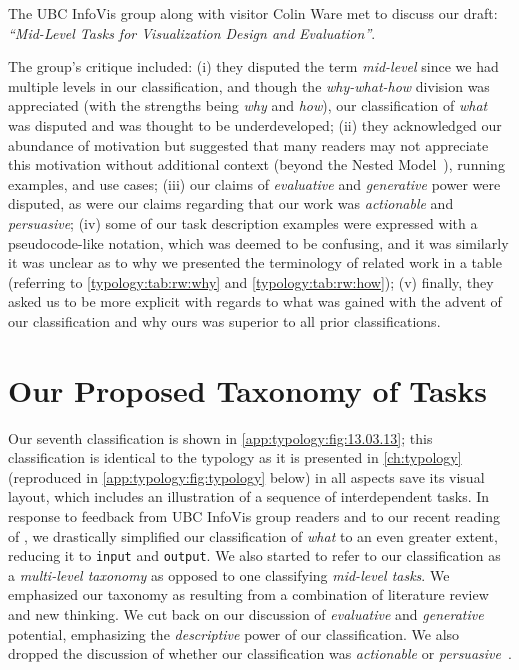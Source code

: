 
The UBC InfoVis group along with visitor Colin Ware met to discuss our draft: {\it``Mid-Level Tasks for Visualization Design and Evaluation''}.

The group's critique included: (i) they disputed the term {\it mid-level} since we had multiple levels in our classification, and though the {\it why-what-how} division was appreciated (with the strengths being {\it why} and {\it how}), our classification of {\it what} was disputed and was thought to be underdeveloped; (ii) they acknowledged our abundance of motivation but suggested that many readers may not appreciate this motivation without additional context (beyond the Nested Model~\cite{Munzner2009}), running examples, and use cases; (iii) our claims of {\it evaluative} and {\it generative} power were disputed, as were our claims regarding that our work was {\it actionable} and {\it persuasive}; (iv) some of our task description examples were expressed with a pseudocode-like notation, which was deemed to be confusing, and it was similarly it was unclear as to why we presented the terminology of related work in a table (referring to \autoref{typology:tab:rw:why} and \autoref{typology:tab:rw:how}); (v) finally, they asked us to be more explicit with regards to what was gained with the advent of our classification and why ours was superior to all prior classifications.

\section{Our Proposed Taxonomy of Tasks}
\label{app:typology:chronology:proposed}


Our seventh classification is shown in \autoref{app:typology:fig:13.03.13}; this classification is identical to the typology as it is presented in \autoref{ch:typology} (reproduced in \autoref{app:typology:fig:typology} below) in all aspects save its visual layout, which includes an illustration of a sequence of interdependent tasks.
In response to feedback from UBC InfoVis group readers and to our recent reading of \citet{Tweedie1997}, we drastically simplified our classification of {\it what} to an even greater extent, reducing it to {\tt input} and {\tt output}.
We also started to refer to our classification as a {\it multi-level taxonomy} as opposed to one classifying {\it mid-level tasks}. 
We emphasized our taxonomy as resulting from a combination of literature review and new thinking.
We cut back on our discussion of {\it evaluative} and {\it generative} potential, emphasizing the {\it descriptive} power of our classification.
We also dropped the discussion of whether our classification was {\it actionable} or {\it persuasive}~\cite{Gleicher2012}.

